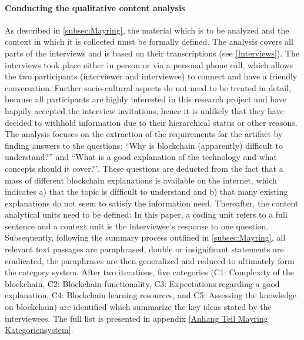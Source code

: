 \paragraph{Conducting the qualitative content analysis} As described in \ref{subsec:Mayring}, the material which is to be analyzed and the context in which it is collected must be formally defined. The analysis covers all parts of the interviews and is based on their transcriptions (see \ref{Interviews}). The interviews took place either in person or via a personal phone call, which allows the two participants (interviewer and interviewee) to connect and have a friendly conversation. Further socio-cultural aspects do not need to be treated in detail, because all participants are highly interested in this research project and have happily accepted the interview invitations, hence it is unlikely that they have decided to withhold information due to their hierarchical status or other reasons. The analysis focuses on the extraction of the requirements for the artifact by finding answers to the questions: \enquote{Why is blockchain (apparently) difficult to understand?} and \enquote{What is a good explanation of the technology and what concepts should it cover?}. These questions are deducted from the fact that a mass of different blockchain explanations is available on the internet, which indicates a) that the topic is difficult to understand and b) that many existing explanations do not seem to satisfy the information need. Thereafter, the content analytical units need to be defined: In this paper, a coding unit refers to a full sentence and a context unit is the interviewee's response to one question. Subsequently, following the summary process outlined in \ref{subsec:Mayring}, all relevant text passages are paraphrased, double or insignificant statements are eradicated, the paraphrases are then generalized and reduced to ultimately form the category system. After two iterations, five categories (C1: Complexity of the blockchain, C2: Blockchain functionality, C3: Expectations regarding a good explanation, C4: Blockchain learning resources, and C5: Assessing the knowledge on blockchain) are identified which summarize the key ideas stated by the interviewees. The full list is presented in appendix \ref{Anhang Teil Mayring Kategoriensystem}.

